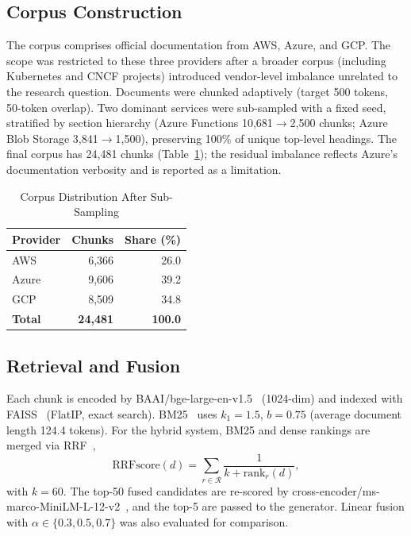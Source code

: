 \documentclass[conference]{IEEEtran}
\begin{document}
\subsection{Corpus Construction}
The corpus comprises official documentation from AWS, Azure, and GCP. The scope was restricted to these three providers after a broader corpus (including Kubernetes and CNCF projects) introduced vendor-level imbalance unrelated to the research question. Documents were chunked adaptively (target 500 tokens, 50-token overlap). Two dominant services were sub-sampled with a fixed seed, stratified by section hierarchy (Azure Functions 10{,}681$\rightarrow$2{,}500 chunks; Azure Blob Storage 3{,}841$\rightarrow$1{,}500), preserving 100\% of unique top-level headings. The final corpus has 24{,}481 chunks (Table~\ref{tab:corpus}); the residual imbalance reflects Azure's documentation verbosity and is reported as a limitation.
\begin{table}[htbp]
\caption{Corpus Distribution After Sub-Sampling}
\begin{center}
\begin{tabular}{lrr}
\toprule
\textbf{Provider} & \textbf{Chunks} & \textbf{Share (\%)} \\
\midrule
AWS & 6{,}366 & 26.0 \\
Azure & 9{,}606 & 39.2 \\
GCP & 8{,}509 & 34.8 \\
\midrule
\textbf{Total} & \textbf{24{,}481} & \textbf{100.0} \\
\bottomrule
\end{tabular}
\label{tab:corpus}
\end{center}
\end{table}
\subsection{Retrieval and Fusion}
Each chunk is encoded by BAAI/bge-large-en-v1.5~\cite{wang2022bge} (1024-dim) and indexed with FAISS~\cite{johnson2019faiss} (FlatIP, exact search). BM25~\cite{robertson2009bm25} uses $k_1=1.5$, $b=0.75$ (average document length 124.4 tokens). For the hybrid system, BM25 and dense rankings are merged via RRF~\cite{cormack2009rrf},
\begin{equation}
\text{RRFscore}(d) = \sum_{r \in \mathcal{R}} \frac{1}{k + \text{rank}_r(d)},
\label{eq:rrf}
\end{equation}
with $k=60$. The top-50 fused candidates are re-scored by cross-encoder/ms-marco-MiniLM-L-12-v2~\cite{nogueira2019passage}, and the top-5 are passed to the generator. Linear fusion with $\alpha\in\{0.3,0.5,0.7\}$ was also evaluated for comparison.
\end{document}
